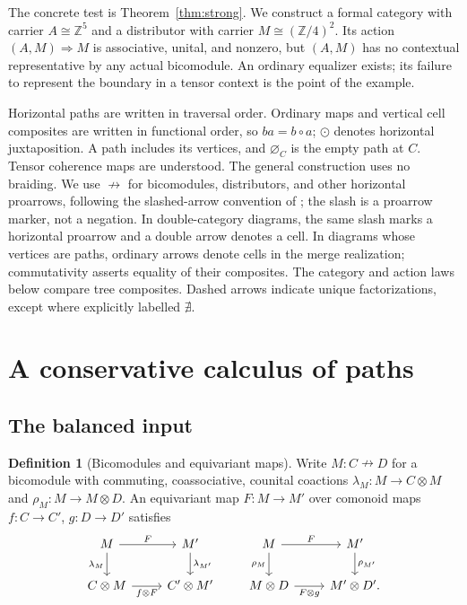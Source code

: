 \documentclass[11pt,a4paper]{article}
\theoremstyle{definition}
\newtheorem{definition}[theorem]{Definition}
\theoremstyle{remark}
\numberwithin{equation}{section}
\newcommand{\Z}{\mathbb Z}
\newcommand{\harr}{\mathrel{\nrightarrow}}
\newcommand{\cell}{\mathrel{\Longrightarrow}}
\newcommand{\wh}{\mathbin{\odot}}
\newcommand{\emp}[1]{\varnothing_{#1}}
\begin{document}
The concrete test is Theorem~\ref{thm:strong}. We construct
a formal category with carrier $A\cong\Z^5$ and a distributor with carrier
$M\cong(\Z/4)^2$. Its action $(A,M)\cell M$ is associative, unital, and
nonzero, but $(A,M)$ has no contextual representative by any actual
bicomodule. An ordinary equalizer exists; its failure to represent the
boundary in a tensor context is the point of the example.

Horizontal paths are written in traversal order. Ordinary maps and
vertical cell composites are written in functional order, so $ba=b\circ a$;
$\wh$ denotes horizontal juxtaposition. A path includes its vertices, and
$\emp C$ is the empty path at $C$. Tensor coherence maps are understood.
The general construction uses no braiding. We use $\harr$ for
bicomodules, distributors, and other horizontal proarrows, following the
slashed-arrow convention of \cite[Definition 2.1]{CS}; the slash is a
proarrow marker, not a negation. In double-category diagrams, the same
slash marks a horizontal proarrow and a double arrow denotes a cell. In diagrams whose vertices are paths,
ordinary arrows denote cells in the merge realization; commutativity
asserts equality of their composites. The category and action laws below
compare tree composites. Dashed arrows indicate unique factorizations,
except where explicitly labelled $\nexists$.

\section{A conservative calculus of paths}\label{sec:construction}

\subsection{The balanced input}

\begin{definition}[Bicomodules and equivariant maps]\label{def:bicomodule}
Write $M:C\harr D$ for a bicomodule with commuting, coassociative,
counital coactions $\lambda_M:M\to C\otimes M$ and
$\rho_M:M\to M\otimes D$. An equivariant map $F:M\to M'$ over
comonoid maps $f:C\to C'$, $g:D\to D'$ satisfies
\[
\begin{tikzcd}
M \arrow[r,"F"] \arrow[d,"\lambda_M"'] &
M' \arrow[d,"\lambda_{M'}"]\\
C\otimes M \arrow[r,"f\otimes F"'] & C'\otimes M'
\end{tikzcd}
\qquad
\begin{tikzcd}
M \arrow[r,"F"] \arrow[d,"\rho_M"'] &
M' \arrow[d,"\rho_{M'}"]\\
M\otimes D \arrow[r,"F\otimes g"'] & M'\otimes D'.
\end{tikzcd}
\]
\end{definition}
\end{document}
